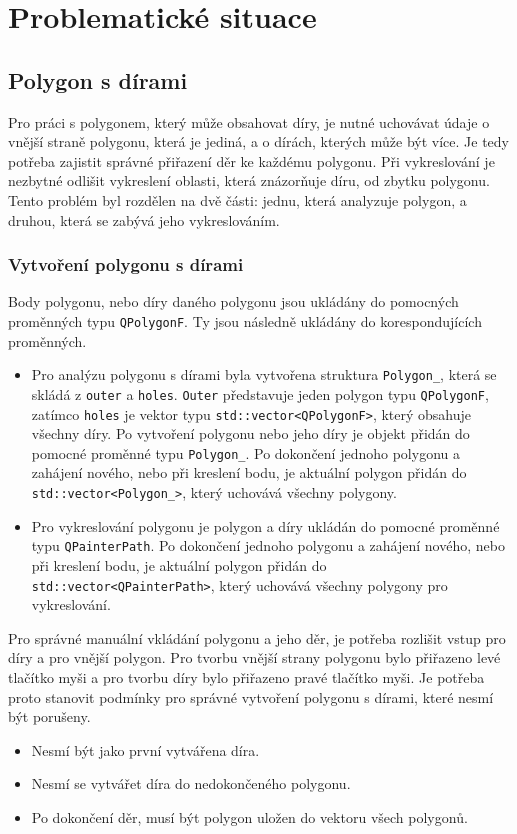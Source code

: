 \section{Problematické situace}

\subsection{Polygon s dírami}
Pro práci s polygonem, který může obsahovat díry, je nutné uchovávat údaje o vnější straně polygonu, která je jediná, a o dírách, kterých může být více. Je tedy potřeba zajistit správné přiřazení děr ke každému polygonu. Při vykreslování je nezbytné odlišit vykreslení oblasti, která znázorňuje díru, od zbytku polygonu. Tento problém byl rozdělen na dvě části: jednu, která analyzuje polygon, a druhou, která se zabývá jeho vykreslováním.

\subsubsection{Vytvoření polygonu s dírami}
Body polygonu, nebo díry daného polygonu jsou ukládány do pomocných proměnných typu \texttt{QPolygonF}. Ty jsou následně ukládány do korespondujících proměnných.
\begin{itemize}
    \item Pro analýzu polygonu s dírami byla vytvořena struktura \texttt{Polygon\_}, která se skládá z \texttt{outer} a \texttt{holes}. \texttt{Outer} představuje jeden polygon typu \texttt{QPolygonF}, zatímco \texttt{holes} je vektor typu \newline \texttt{std::vector<QPolygonF>}, který obsahuje všechny díry. Po vytvoření polygonu nebo jeho díry je objekt přidán do pomocné proměnné typu \texttt{Polygon\_}. Po dokončení jednoho polygonu a zahájení nového, nebo při kreslení bodu, je aktuální polygon přidán do \texttt{std::vector<Polygon\_>}, který uchovává všechny polygony.
    \item Pro vykreslování polygonu je polygon a díry ukládán do pomocné proměnné typu \texttt{QPainterPath}. Po dokončení jednoho polygonu a zahájení nového, nebo při kreslení bodu, je aktuální polygon přidán do \texttt{std::vector<QPainterPath>}, který uchovává všechny polygony pro vykreslování.
\end{itemize}
Pro správné manuální vkládání polygonu a jeho děr, je potřeba rozlišit vstup pro díry a pro vnější polygon. Pro tvorbu vnější strany polygonu bylo přiřazeno levé tlačítko myši a pro tvorbu díry bylo přiřazeno pravé tlačítko myši. Je potřeba proto stanovit podmínky pro správné vytvoření polygonu s dírami, které nesmí být porušeny.
\begin{itemize}
    \item Nesmí být jako první vytvářena díra.
    \item Nesmí se vytvářet díra do nedokončeného polygonu.
    \item Po dokončení děr, musí být polygon uložen do vektoru všech polygonů.
\end{itemize}

